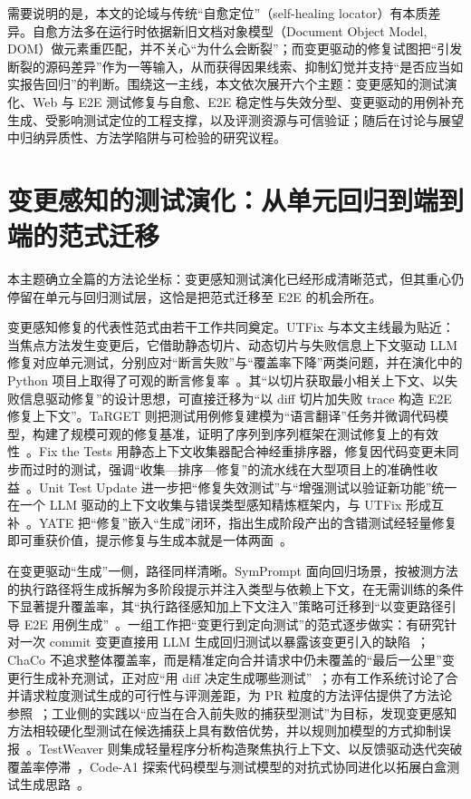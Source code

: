 \documentclass[11pt,a4paper]{article}
\begin{document}
需要说明的是，本文的论域与传统“自愈定位”（self-healing locator）有本质差异。自愈方法多在运行时依据新旧文档对象模型（Document Object Model, DOM）做元素重匹配，并不关心“为什么会断裂”；而变更驱动的修复试图把“引发断裂的源码差异”作为一等输入，从而获得因果线索、抑制幻觉并支持“是否应当如实报告回归”的判断。围绕这一主线，本文依次展开六个主题：变更感知的测试演化、Web 与 E2E 测试修复与自愈、E2E 稳定性与失效分型、变更驱动的用例补充生成、受影响测试定位的工程支撑，以及评测资源与可信验证；随后在讨论与展望中归纳异质性、方法学陷阱与可检验的研究议程。

\section{变更感知的测试演化：从单元回归到端到端的范式迁移}

本主题确立全篇的方法论坐标：变更感知测试演化已经形成清晰范式，但其重心仍停留在单元与回归测试层，这恰是把范式迁移至 E2E 的机会所在。

变更感知修复的代表性范式由若干工作共同奠定。UTFix 与本文主线最为贴近：当焦点方法发生变更后，它借助静态切片、动态切片与失败信息上下文驱动 LLM 修复对应单元测试，分别应对“断言失败”与“覆盖率下降”两类问题，并在演化中的 Python 项目上取得了可观的断言修复率~\cite{utfix}。其“以切片获取最小相关上下文、以失败信息驱动修复”的设计思想，可直接迁移为“以 diff 切片加失败 trace 构造 E2E 修复上下文”。TaRGET 则把测试用例修复建模为“语言翻译”任务并微调代码模型，构建了规模可观的修复基准，证明了序列到序列框架在测试修复上的有效性~\cite{target}。Fix the Tests 用静态上下文收集器配合神经重排序器，修复因代码变更未同步而过时的测试，强调“收集—排序—修复”的流水线在大型项目上的准确性收益~\cite{fixthetests}。Unit Test Update 进一步把“修复失效测试”与“增强测试以验证新功能”统一在一个 LLM 驱动的上下文收集与错误类型感知精炼框架内，与 UTFix 形成互补~\cite{unittestupdate}。YATE 把“修复”嵌入“生成”闭环，指出生成阶段产出的含错测试经轻量修复即可重获价值，提示修复与生成本就是一体两面~\cite{yate}。

在变更驱动“生成”一侧，路径同样清晰。SymPrompt 面向回归场景，按被测方法的执行路径将生成拆解为多阶段提示并注入类型与依赖上下文，在无需训练的条件下显著提升覆盖率，其“执行路径感知加上下文注入”策略可迁移到“以变更路径引导 E2E 用例生成”~\cite{symprompt}。一组工作把“变更行到定向测试”的范式逐步做实：有研究针对一次 commit 变更直接用 LLM 生成回归测试以暴露该变更引入的缺陷~\cite{canllmcommit}；ChaCo 不追求整体覆盖率，而是精准定向合并请求中仍未覆盖的“最后一公里”变更行生成补充测试，正对应“用 diff 决定生成哪些测试”~\cite{chaco}；亦有工作系统讨论了合并请求粒度测试生成的可行性与评测差距，为 PR 粒度的方法评估提供了方法论参照~\cite{prawareunit}；工业侧的实践以“应当在合入前失败的捕获型测试”为目标，发现变更感知方法相较硬化型测试在候选捕获上具有数倍优势，并以规则加模型的方式抑制误报~\cite{jitcatching}。TestWeaver 则集成轻量程序分析构造聚焦执行上下文、以反馈驱动迭代突破覆盖率停滞~\cite{testweaver}，Code-A1 探索代码模型与测试模型的对抗式协同进化以拓展白盒测试生成思路~\cite{codea1}。
\end{document}
